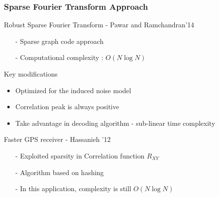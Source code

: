 \documentclass[10pt,xcolor=table]{beamer}
\begin{document}
\begin{frame}\frametitle{Sparse Fourier Transform Approach}
        \begin{block}{Robust Sparse Fourier Transform - Pawar and Ramchandran'14}
	 		\begin{itemize}
	 			\item[-] Sparse graph code approach
	 			\item[-] Computational complexity : $O(N \log N)$
	 		\end{itemize}
	 	\end{block}
\pause
\begin{block}{Key modifications}
   \begin{itemize}
   	\item Optimized for the induced noise model
   	\item Correlation peak is always {\color{blue} positive}
   	\item Take advantage in decoding algorithm - {\color{blue}sub-linear} time complexity
   \end{itemize}
\end{block}
\pause
        \begin{block}{Faster GPS receiver - Hassanieh '12}
	 		\begin{itemize}
	 			\item[-] Exploited sparsity in Correlation function $R_{XY}$
                \item[-] Algorithm based on hashing
                \item[-] In this application, complexity is still $O(N \log N)$
	 		\end{itemize}		
	 	\end{block}	 	


\end{frame}

\end{document}
